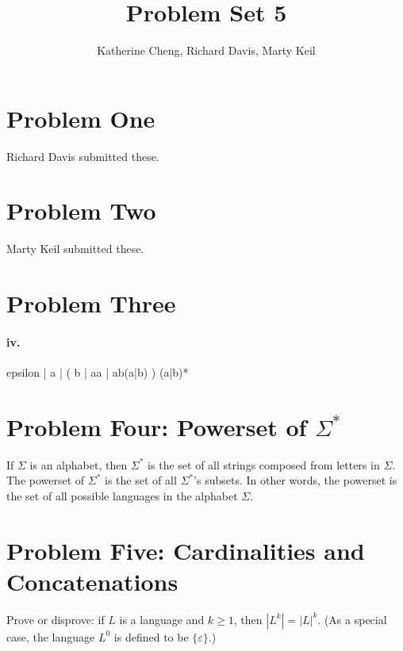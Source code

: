 \documentclass[10pt,letter]{article}
\begin{document}

\title{Problem Set 5}

\author{Katherine Cheng, Richard Davis, Marty Keil}

 
\maketitle 

\section*{Problem One} Richard Davis submitted these.

\section*{Problem Two} Marty Keil submitted these.

\section*{Problem Three} 

\paragraph{iv.} 
epsilon | a | ( b | aa | ab(a|b) ) (a|b)*

\section*{Problem Four: Powerset of $\Sigma^*$}
If $\Sigma$ is an alphabet, then $\Sigma^*$ is the set of all strings composed from letters in $\Sigma$. The powerset of $\Sigma^*$ is the set of all $\Sigma^*$'s subsets. In other words, the powerset is the set of all possible languages in the alphabet $\Sigma$. 

\section*{Problem Five: Cardinalities and Concatenations}
Prove or disprove: if $L$ is a language and $k \ge 1$, then $|L^k| = |L|^k$. (As a special case, the language $L^0$ is defined to be $\{\varepsilon\}$.) 
\end{document}
